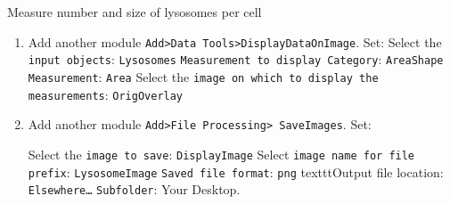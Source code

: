 \begin{taskbox}{Measure number and size of lysosomes per cell}
\begin{enumerate}
\item Add another module \texttt{Add>Data Tools>DisplayDataOnImage}. Set:\newline
Select the \texttt{input objects}: \texttt{Lysosomes}\newline 
\texttt{Measurement to display Category}: \texttt{AreaShape}\newline 
\texttt{Measurement}: \texttt{Area}\newline
Select the \texttt{image on which to display the measurements}: \texttt{OrigOverlay}\newline 
	\begin{minipage}[t]{\linewidth}
		\begin{center}
		\medskip
		\label{fig:cpDisplayData}
		\end{center}
	\end{minipage}
	
\item Add another module \texttt{Add>File Processing> SaveImages}. Set:

Select the \texttt{image to save}: \texttt{DisplayImage}\newline
Select \texttt{image name for file prefix}: \texttt{LysosomeImage}\newline
\texttt{Saved file format}: \texttt{png}\newline
texttt{Output file location}: \texttt{Elsewhere…}\newline
\texttt{Subfolder}: Your Desktop.

	\begin{minipage}[t]{\linewidth}
		\begin{center}
		\medskip
		\label{fig:cpSaveImages}
		\end{center}
	\end{minipage}
	

\end{enumerate}
\end{taskbox}
